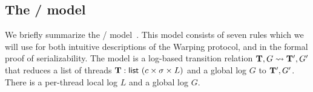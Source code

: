 \newcommand\STEP{{\sc step}}
\newcommand\BEGIN{{\sc begin}}
\newcommand\LOCAL{{\sc local}}
\newcommand\FIN{{\sc fin}}
\newcommand\FORK{{\sc fork}}

\subsection{The \PUSH{}/\PULL{} model}

We briefly summarize the \PUSH{}/\PULL{} model~\cite{KP:PLDI15}. This model consists of
seven rules which we will use for both intuitive descriptions of the
Warping protocol, and in the formal proof of serializability.
The \PMPY{} model is a log-based transition relation
$\mathbf{T},G \rightsquigarrow \mathbf{T}', G'$ that reduces
a list of threads $\mathbf{T} : \textsf{list } (c\times \sigma
\times L)$ and a global log $G$ to $\mathbf{T}',G'$.
%
There is a per-thread local log $L$ and a global log $G$.


